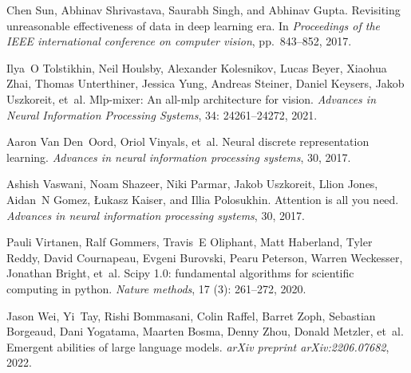 \documentclass{article} %
\begin{document}
\begin{thebibliography}{44}
Chen Sun, Abhinav Shrivastava, Saurabh Singh, and Abhinav Gupta.
\newblock Revisiting unreasonable effectiveness of data in deep learning era.
\newblock In \emph{Proceedings of the IEEE international conference on computer
  vision}, pp.\  843--852, 2017.

Ilya~O Tolstikhin, Neil Houlsby, Alexander Kolesnikov, Lucas Beyer, Xiaohua
  Zhai, Thomas Unterthiner, Jessica Yung, Andreas Steiner, Daniel Keysers,
  Jakob Uszkoreit, et~al.
\newblock Mlp-mixer: An all-mlp architecture for vision.
\newblock \emph{Advances in Neural Information Processing Systems},
  34: 24261--24272, 2021.

Aaron Van Den~Oord, Oriol Vinyals, et~al.
\newblock Neural discrete representation learning.
\newblock \emph{Advances in neural information processing systems}, 30, 2017.

Ashish Vaswani, Noam Shazeer, Niki Parmar, Jakob Uszkoreit, Llion Jones,
  Aidan~N Gomez, {\L}ukasz Kaiser, and Illia Polosukhin.
\newblock Attention is all you need.
\newblock \emph{Advances in neural information processing systems}, 30, 2017.

Pauli Virtanen, Ralf Gommers, Travis~E Oliphant, Matt Haberland, Tyler Reddy,
  David Cournapeau, Evgeni Burovski, Pearu Peterson, Warren Weckesser, Jonathan
  Bright, et~al.
\newblock Scipy 1.0: fundamental algorithms for scientific computing in python.
\newblock \emph{Nature methods}, 17 (3): 261--272, 2020.

Jason Wei, Yi~Tay, Rishi Bommasani, Colin Raffel, Barret Zoph, Sebastian
  Borgeaud, Dani Yogatama, Maarten Bosma, Denny Zhou, Donald Metzler, et~al.
\newblock Emergent abilities of large language models.
\newblock \emph{arXiv preprint arXiv:2206.07682}, 2022{}.


\end{thebibliography}
\end{document}
